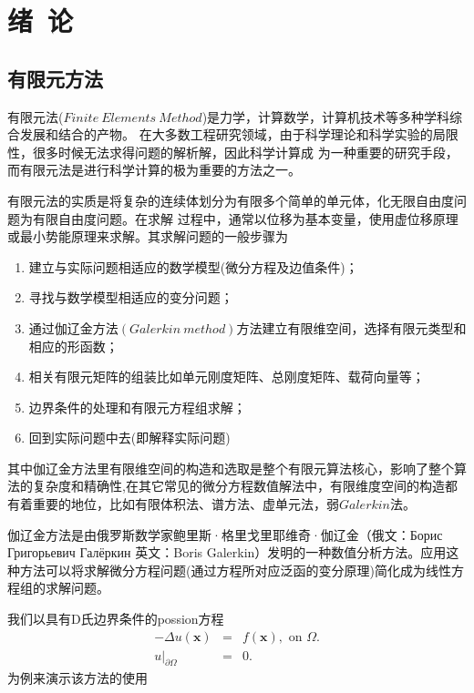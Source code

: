\pagestyle{plain}
\newpage
\chapter{绪~论}\label{Chap:Introduction}

\section{有限元方法}
有限元法($Finite\ Elements\ Method$)是力学，计算数学，计算机技术等多种学科综合发展和结合的产物。
在大多数工程研究领域，由于科学理论和科学实验的局限性，很多时候无法求得问题的解析解，因此科学计算成
为一种重要的研究手段，而有限元法是进行科学计算的极为重要的方法之一。

有限元法的实质是将复杂的连续体划分为有限多个简单的单元体，化无限自由度问题为有限自由度问题。在求解
过程中，通常以位移为基本变量，使用虚位移原理或最小势能原理来求解。其求解问题的一般步骤为
\begin{enumerate}
	\item 建立与实际问题相适应的数学模型(微分方程及边值条件)；
	\item 寻找与数学模型相适应的变分问题；
	\item 通过伽辽金方法$(Galerkin\ method)$方法建立有限维空间，选择有限元类型和相应的形函数；
	\item 相关有限元矩阵的组装比如单元刚度矩阵、总刚度矩阵、载荷向量等；
	\item 边界条件的处理和有限元方程组求解；
	\item 回到实际问题中去(即解释实际问题)
\end{enumerate}

其中伽辽金方法里有限维空间的构造和选取是整个有限元算法核心，影响了整个算法的复杂度和精确性,在其它常见的微分方程数值解法中，有限维度空间的构造都有着重要的地位，比如有限体积法、谱方法、虚单元法，弱$Galerkin$法。

伽辽金方法是由俄罗斯数学家鲍里斯·格里戈里耶维奇·伽辽金（俄文：Борис Григорьевич Галёркин 英文：Boris Galerkin）发明的一种数值分析方法。应用这种方法可以将求解微分方程问题(通过方程所对应泛函的变分原理)简化成为线性方程组的求解问题。

我们以具有D氏边界条件的possion方程
\begin{eqnarray}
	-\Delta u(\mathbf x) &=& f(\mathbf x),\text{ on } \Omega.\label{eq:P}\\
	u|_{\partial\Omega} &=& 0.
\end{eqnarray}
为例来演示该方法的使用

